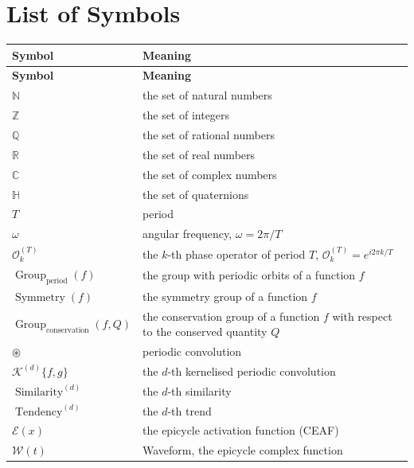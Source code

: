 \listoffigures
\listoftables

\chapter*{List of Symbols}

\begin{longtable}{@{}p{4.4cm}p{9.3cm}@{}}
\toprule
\textbf{Symbol} & \textbf{Meaning} \\
\midrule
\endfirsthead

\toprule
\textbf{Symbol} & \textbf{Meaning} \\
\midrule
\endhead

\bottomrule
\endlastfoot

$\mathbb{N}$ & the set of natural numbers \\
$\mathbb{Z}$ & the set of integers \\
$\mathbb{Q}$ & the set of rational numbers \\
$\mathbb{R}$ & the set of real numbers \\
$\mathbb{C}$ & the set of complex numbers \\
$\mathbb{H}$ & the set of quaternions \\
$T$ & period \\
$\omega$ & angular frequency, $\omega = 2\pi/T$ \\
$\mathcal{O}_k^{(T)}$ & the $k$-th phase operator of period $T$, $\mathcal{O}_k^{(T)} = e^{i2\pi k/T}$ \\
$\operatorname{Group}_{\mathrm{period}}(f)$ & the group with periodic orbits of a function $f$ \\
$\operatorname{Symmetry}(f)$ & the symmetry group of a function $f$ \\
$\operatorname{Group}_{\mathrm{conservation}}(f,Q)$ & the conservation group of a function $f$ with respect to the conserved quantity $Q$ \\
$\circledast$ & periodic convolution \\
$\mathcal{K}^{(d)}\{f,g\}$ & the $d$-th kernelised periodic convolution \\
$\operatorname{Similarity}^{(d)}$ & the $d$-th similarity \\
$\operatorname{Tendency}^{(d)}$ & the $d$-th trend \\
$\mathcal{E}(x)$ & the epicycle activation function (CEAF) \\
$\mathcal{W}(t)$ & Waveform, the epicycle complex function \\

\end{longtable}
